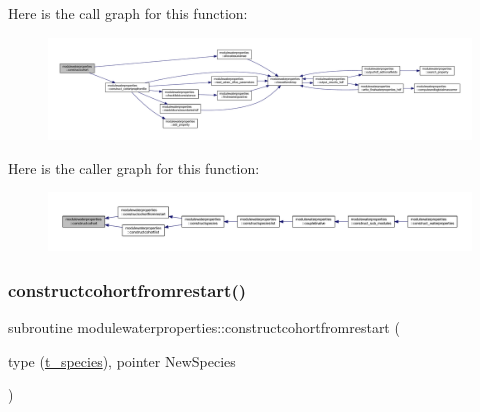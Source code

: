 Here is the call graph for this function\+:\nopagebreak
\begin{figure}[H]
\begin{center}
\leavevmode
\includegraphics[width=350pt]{namespacemodulewaterproperties_ae8f037a58e95e5182b8c0d4b073ad271_cgraph}
\end{center}
\end{figure}
Here is the caller graph for this function\+:\nopagebreak
\begin{figure}[H]
\begin{center}
\leavevmode
\includegraphics[width=350pt]{namespacemodulewaterproperties_ae8f037a58e95e5182b8c0d4b073ad271_icgraph}
\end{center}
\end{figure}
\mbox{\label{namespacemodulewaterproperties_a1c0b4f7abb2ee1226f22838efe265c80}} 
\subsubsection{\texorpdfstring{constructcohortfromrestart()}{constructcohortfromrestart()}}
{\footnotesize\ttfamily subroutine modulewaterproperties\+::constructcohortfromrestart (\begin{DoxyParamCaption}\item[{type (\mbox{\hyperlink{structmodulewaterproperties_1_1t__species}{t\+\_\+species}}), pointer}]{New\+Species }\end{DoxyParamCaption})\hspace{0.3cm}{\ttfamily [private]}}

